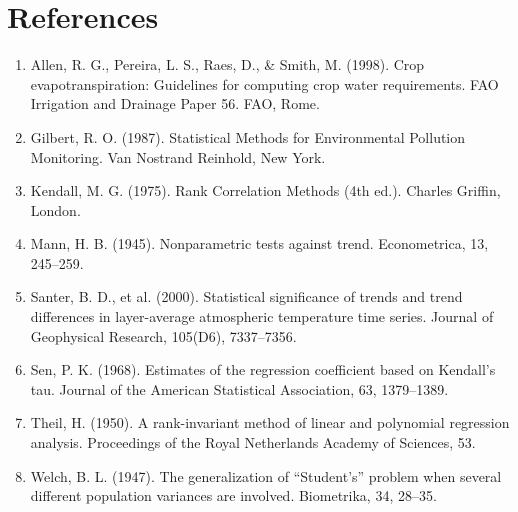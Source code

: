 \documentclass[10pt,a4paper]{article}
\begin{document}
\section*{References}
\begin{enumerate}
\item Allen, R. G., Pereira, L. S., Raes, D., \& Smith, M. (1998). Crop evapotranspiration: Guidelines for computing crop water requirements. FAO Irrigation and Drainage Paper 56. FAO, Rome.
\item Gilbert, R. O. (1987). Statistical Methods for Environmental Pollution Monitoring. Van Nostrand Reinhold, New York.
\item Kendall, M. G. (1975). Rank Correlation Methods (4th ed.). Charles Griffin, London.
\item Mann, H. B. (1945). Nonparametric tests against trend. Econometrica, 13, 245--259.
\item Santer, B. D., et al. (2000). Statistical significance of trends and trend differences in layer-average atmospheric temperature time series. Journal of Geophysical Research, 105(D6), 7337--7356.
\item Sen, P. K. (1968). Estimates of the regression coefficient based on Kendall's tau. Journal of the American Statistical Association, 63, 1379--1389.
\item Theil, H. (1950). A rank-invariant method of linear and polynomial regression analysis. Proceedings of the Royal Netherlands Academy of Sciences, 53.
\item Welch, B. L. (1947). The generalization of ``Student's'' problem when several different population variances are involved. Biometrika, 34, 28--35.
\end{enumerate}
\end{document}
